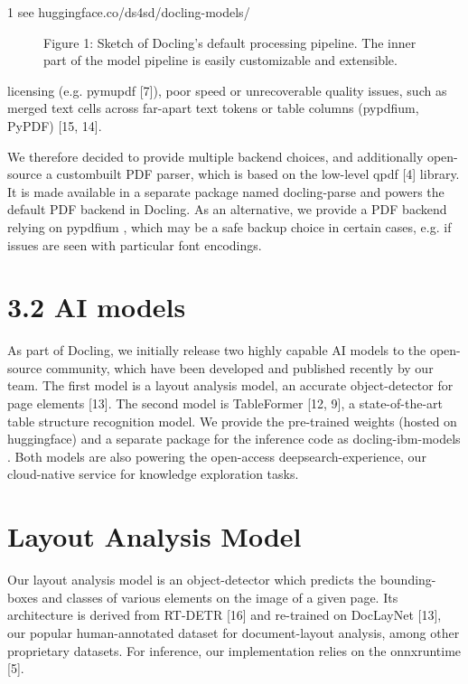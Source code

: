 \documentclass[11pt,a4paper]{article}
\begin{document}
1 see huggingface.co/ds4sd/docling-models/

\begin{figure}[h]
\caption{Figure 1: Sketch of Docling's default processing pipeline. The inner part of the model pipeline is easily customizable and extensible.}
\end{figure}

licensing (e.g. pymupdf [7]), poor speed or unrecoverable quality issues, such as merged text cells across far-apart text tokens or table columns (pypdfium, PyPDF) [15, 14].

We therefore decided to provide multiple backend choices, and additionally open-source a custombuilt PDF parser, which is based on the low-level qpdf [4] library. It is made available in a separate package named docling-parse and powers the default PDF backend in Docling. As an alternative, we provide a PDF backend relying on pypdfium , which may be a safe backup choice in certain cases, e.g. if issues are seen with particular font encodings.

\section{3.2 AI models}

As part of Docling, we initially release two highly capable AI models to the open-source community, which have been developed and published recently by our team. The first model is a layout analysis model, an accurate object-detector for page elements [13]. The second model is TableFormer [12, 9], a state-of-the-art table structure recognition model. We provide the pre-trained weights (hosted on huggingface) and a separate package for the inference code as docling-ibm-models . Both models are also powering the open-access deepsearch-experience, our cloud-native service for knowledge exploration tasks.

\section{Layout Analysis Model}

Our layout analysis model is an object-detector which predicts the bounding-boxes and classes of various elements on the image of a given page. Its architecture is derived from RT-DETR [16] and re-trained on DocLayNet [13], our popular human-annotated dataset for document-layout analysis, among other proprietary datasets. For inference, our implementation relies on the onnxruntime [5].
\end{document}
